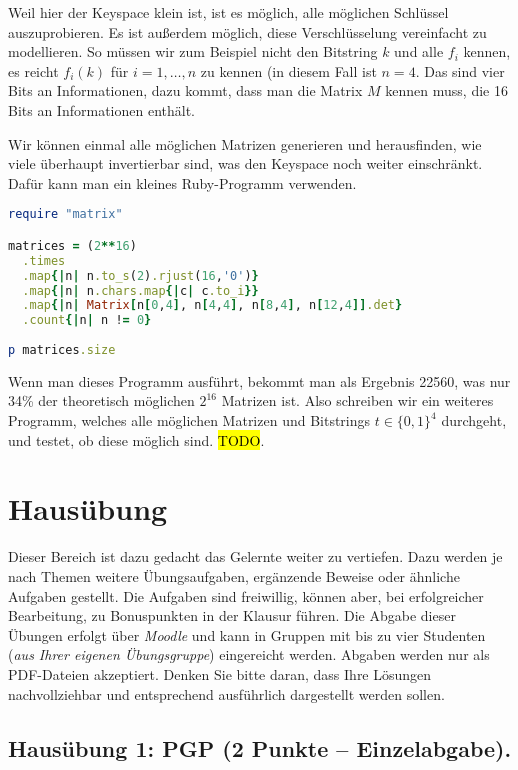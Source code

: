 \documentclass[
  ngerman,
  DIV=12
]{scrartcl}
\begin{document}
\medskip\noindent
Weil hier der Keyspace klein ist, ist es möglich, alle möglichen Schlüssel auszuprobieren. Es ist außerdem möglich, diese Verschlüsselung vereinfacht zu modellieren. So müssen wir zum Beispiel nicht den Bitstring $k$ und alle $f_i$ kennen, es reicht $f_i(k)$ für $i = 1, \dots, n$ zu kennen (in diesem Fall ist $n = 4$. Das sind vier Bits an Informationen, dazu kommt, dass man die Matrix $M$ kennen muss, die 16 Bits an Informationen enthält.

Wir können einmal alle möglichen Matrizen generieren und herausfinden, wie viele überhaupt invertierbar sind, was den Keyspace noch weiter einschränkt. Dafür kann man ein kleines Ruby-Programm verwenden.
\begin{lstlisting}[language=ruby]
require "matrix"

matrices = (2**16)
  .times
  .map{|n| n.to_s(2).rjust(16,'0')}
  .map{|n| n.chars.map{|c| c.to_i}}
  .map{|n| Matrix[n[0,4], n[4,4], n[8,4], n[12,4]].det}
  .count{|n| n != 0}
  
p matrices.size
\end{lstlisting}
Wenn man dieses Programm ausführt, bekommt man als Ergebnis 22560, was nur 34\% der theoretisch möglichen $2^{16}$ Matrizen ist. Also schreiben wir ein weiteres Programm, welches alle möglichen Matrizen und Bitstrings $t \in \{0, 1\}^4$ durchgeht, und testet, ob diese möglich sind. \hl{TODO}.

\section{Hausübung}

Dieser Bereich ist dazu gedacht das Gelernte weiter zu vertiefen. Dazu werden je nach Themen weitere Übungsaufgaben, ergänzende Beweise oder ähnliche Aufgaben gestellt. Die Aufgaben sind freiwillig, können aber, bei erfolgreicher Bearbeitung, zu Bonuspunkten in der Klausur führen. Die Abgabe dieser Übungen erfolgt über \emph{Moodle} und kann in Gruppen mit bis zu vier Studenten (\emph{aus Ihrer eigenen Übungsgruppe}) eingereicht werden. Abgaben werden nur als PDF-Dateien akzeptiert. Denken Sie bitte daran, dass Ihre Lösungen nachvollziehbar und entsprechend ausführlich dargestellt werden sollen.

\subsection*{Hausübung 1: PGP (2 Punkte -- Einzelabgabe).}
\end{document}
